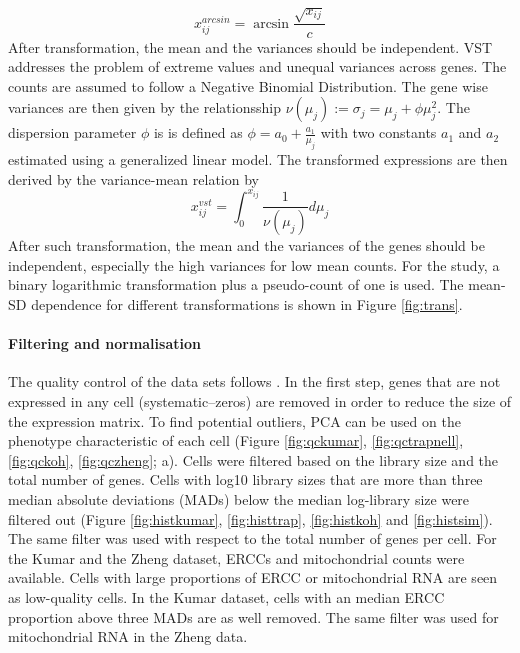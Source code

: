 \documentclass[12pt, a4paper]{article}\usepackage[]{graphicx}\usepackage[]{color}
\begin{document}
\begin{equation}
x_{ij}^{arcsin} = \arcsin \frac{\sqrt{x_{ij}} }{c}
\end{equation}
After transformation, the mean and the variances should be independent. 
VST addresses the problem of extreme values and unequal variances across genes. The counts are assumed to follow a Negative Binomial Distribution. The gene wise variances are then given by the relationsship $\nu(\mu_j) := \sigma_{j}=\mu_j + \phi\mu_{j}^2 $. The dispersion parameter $\phi$ is is defined as $\phi=a_{0} + \frac{a_{1}}{\mu_{j}}$ with two constants $a_{1}$ and $a_{2}$ estimated using a generalized linear model. 
The transformed expressions are then derived by the variance-mean relation by
\begin{equation}
x_{ij}^{vst} = \int_{0}^{x_{ij}} \frac{1}{\nu(\mu_j)} d\mu_j
\end{equation}
After such transformation, the mean and the variances of the genes should be independent, especially the high variances for low mean counts.  For the study, a binary logarithmic transformation plus a pseudo-count of one is used.  The mean-SD dependence for different transformations is shown in Figure \ref{fig:trans}.

\newpage
\paragraph{Filtering and normalisation}
The quality control of the data sets follows \citet{lun2016step}. In the first step, genes that are not expressed in any cell (systematic--zeros) are removed in order to reduce the size of the expression matrix. To find potential outliers, PCA can be used on the phenotype characteristic of each cell (Figure \ref{fig:qckumar}, \ref{fig:qctrapnell}, \ref{fig:qckoh}, \ref{fig:qczheng}; a). Cells were filtered based on the library size and the total number of genes.
Cells with log10 library sizes that are more than three median absolute deviations (MADs) below the median log-library size were filtered out (Figure \ref{fig:histkumar}, \ref{fig:histtrap}, \ref{fig:histkoh} and \ref{fig:histsim}). The same filter was used with respect to the total number of genes per cell. 
For the Kumar and the Zheng dataset, ERCCs and mitochondrial counts were available. Cells with large proportions of ERCC or mitochondrial RNA are seen as low-quality cells. In the Kumar dataset, cells with an median ERCC proportion above three MADs are as well removed. The same filter was used for mitochondrial RNA in the Zheng data.
\end{document}
